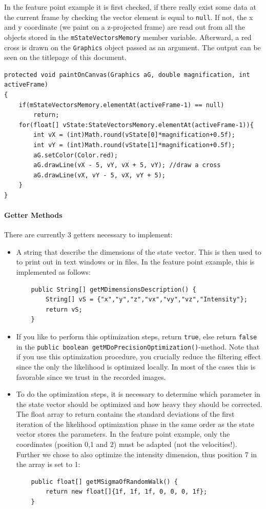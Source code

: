 \documentclass{scrartcl}
\begin{document}
In the feature point example it is first checked, if there really exist some data at the current frame by checking the vector element is equal to \texttt{null}. If not, the x and y coordinate (we paint on a z-projected frame) are read out from all the objects stored in the \texttt{mStateVectorsMemory} member variable. Afterward, a red cross is drawn on the \texttt{Graphics} object passed as an argument. The output can be seen on the titlepage of this document.
\begin{lstlisting}
protected void paintOnCanvas(Graphics aG, double magnification, int activeFrame) 
{
	if(mStateVectorsMemory.elementAt(activeFrame-1) == null)
		return;
	for(float[] vState:StateVectorsMemory.elementAt(activeFrame-1)){
		int vX = (int)Math.round(vState[0]*magnification+0.5f);
		int vY = (int)Math.round(vState[1]*magnification+0.5f);
		aG.setColor(Color.red);
		aG.drawLine(vX - 5, vY, vX + 5, vY); //draw a cross
		aG.drawLine(vX, vY - 5, vX, vY + 5);
	}
}
\end{lstlisting}

\paragraph{Getter Methods}
There are currently 3 getters necessary to implement:
\begin{itemize}
	\item A string that describe the dimensions of the state vector. This is then used to to print out in text windows or in files. In the feature point example, this is implemented as follows:
	\begin{lstlisting}
	public String[] getMDimensionsDescription() {
		String[] vS = {"x","y","z","vx","vy","vz","Intensity"};
		return vS;
	}
	\end{lstlisting}
	\item If you like to perform this optimization steps, return \texttt{true}, else return \texttt{false} in the \lstinline{public boolean getMDoPrecisionOptimization()}-method. Note that if you use this optimization procedure, you crucially reduce the filtering effect since the only the likelihood is optimized locally. In most of the cases this is favorable since we trust in the recorded images.
	\item To do the optimization steps, it is necessary to determine which parameter in the state vector should be optimized and how heavy they should be corrected. The float array to return contains the standard deviations of the first iteration of the likelihood optimization phase in the same order as the state vector stores the parameters. In the feature point example, only the coordinates (position 0,1 and 2) must be adapted (not the velocities!). Further we chose to also optimize the intensity dimension, thus position 7 in the array is set to 1:
	\begin{lstlisting}
	public float[] getMSigmaOfRandomWalk() {
		return new float[]{1f, 1f, 1f, 0, 0, 0, 1f};
	}	
	\end{lstlisting}
\end{itemize}
\end{document}
